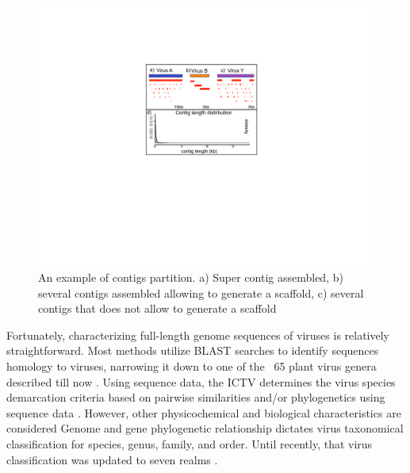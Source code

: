 \documentclass[11pt]{article}
\begin{document}
\begin{figure}[h!]
\centerline{\includegraphics[scale=1]{figs/Fig3_contigs.pdf}}
\caption{An example of contigs partition. a) Super contig assembled, b) several contigs assembled allowing to generate a scaffold, c) several contigs that does not allow to generate a scaffold}
\end{figure}

Fortunately, characterizing full-length genome sequences of viruses is relatively straightforward. Most methods utilize BLAST searches to identify sequences homology to viruses, narrowing it down to one of the ~65 plant virus genera described till now \cite{king_virus_2011, lefkowitz_virus_2018}. Using sequence data, the ICTV determines the virus species demarcation criteria based on pairwise similarities and/or phylogenetics using sequence data \cite{lefkowitz_virus_2018}. However, other physicochemical and biological characteristics are considered \cite{king_virus_2011, lefkowitz_virus_2018} 
Genome and gene phylogenetic relationship dictates virus taxonomical classification for species, genus, family, and order. Until recently, that virus classification was updated to seven realms \cite{gorbalenya_new_2020}. 


\end{document}
